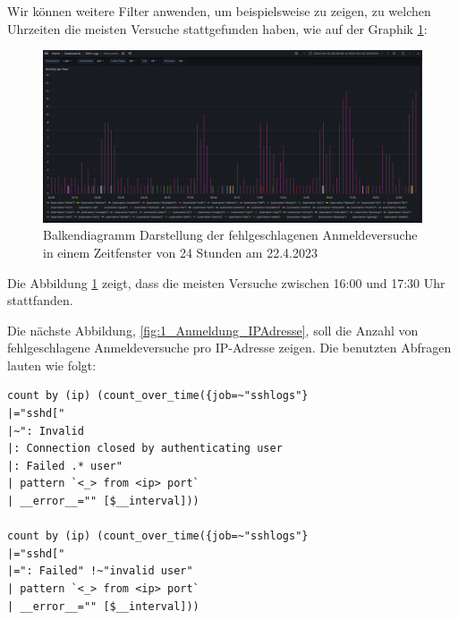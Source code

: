\newpage
{}
\thispagestyle{lscape}
\begin{landscape}
  Wir können weitere Filter anwenden, um beispielsweise zu zeigen, zu welchen Uhrzeiten die meisten Versuche stattgefunden haben, wie auf der Graphik \ref{fig:2_Anmeldung_BenutzerName}:
    \begin{figure}[H]
        \centerline{\includegraphics[width=1.5\textwidth]{assets/activityperhour.png}}
        \caption[Balkendiagramm Darstellung der fehlgeschlagenen Anmeldeversuche in einem Zeitfenster von 24 Stunden am ]
        {Balkendiagramm Darstellung der fehlgeschlagenen Anmeldeversuche in einem Zeitfenster von 24 Stunden am 22.4.2023}
        \label{fig:2_Anmeldung_BenutzerName}
        \centering
    \end{figure}
  Die Abbildung \ref{fig:2_Anmeldung_BenutzerName} zeigt, dass die meisten Versuche zwischen 16:00 und 17:30 Uhr stattfanden.
\end{landscape}
\restoregeometry


Die nächste Abbildung, \ref{fig:1_Anmeldung_IPAdresse}, soll die Anzahl von fehlgeschlagene Anmeldeversuche pro IP-Adresse zeigen. Die benutzten Abfragen lauten wie folgt:
{
\begin{Verbatim}[frame=single]
count by (ip) (count_over_time({job=~"sshlogs"} 
|="sshd[" 
|~": Invalid
|: Connection closed by authenticating user
|: Failed .* user" 
| pattern `<_> from <ip> port` 
| __error__="" [$__interval]))

count by (ip) (count_over_time({job=~"sshlogs"} 
|="sshd[" 
|=": Failed" !~"invalid user" 
| pattern `<_> from <ip> port` 
| __error__="" [$__interval]))
\end{Verbatim}
}


